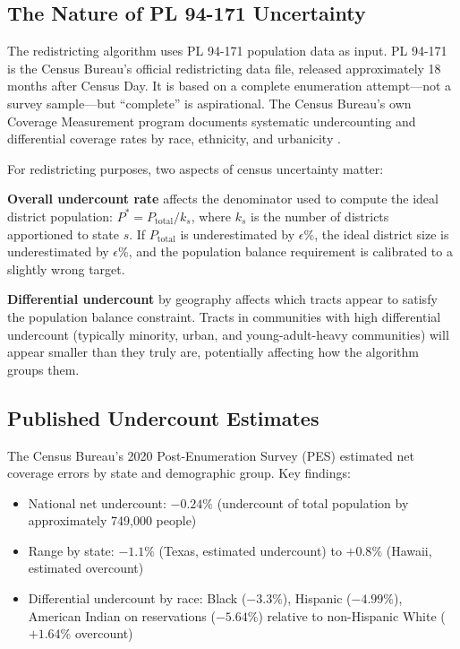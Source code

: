 
\subsection{The Nature of PL 94-171 Uncertainty}

The redistricting algorithm uses PL 94-171 population data \citep{pl94171}
as input. PL 94-171 is the Census Bureau's official redistricting data
file, released approximately 18 months after Census Day. It is based on
a complete enumeration attempt---not a survey sample---but ``complete''
is aspirational. The Census Bureau's own Coverage Measurement program
documents systematic undercounting and differential coverage rates by
race, ethnicity, and urbanicity \citep{brown2018demographic,
daponte2021census}.

For redistricting purposes, two aspects of census uncertainty matter:

\textbf{Overall undercount rate} affects the denominator used to compute
the ideal district population: $P^* = P_\text{total} / k_s$, where
$k_s$ is the number of districts apportioned to state $s$.
If $P_\text{total}$ is underestimated by $\epsilon\%$, the ideal
district size is underestimated by $\epsilon\%$, and the population
balance requirement is calibrated to a slightly wrong target.

\textbf{Differential undercount} by geography affects which tracts
appear to satisfy the population balance constraint. Tracts in
communities with high differential undercount (typically minority,
urban, and young-adult-heavy communities) will appear smaller than they
truly are, potentially affecting how the algorithm groups them.

\subsection{Published Undercount Estimates}

The Census Bureau's 2020 Post-Enumeration Survey (PES)
\citep{uscensusbureau2022net} estimated net coverage errors by state
and demographic group. Key findings:
\begin{itemize}
  \item National net undercount: $-0.24\%$ (undercount of total
    population by approximately 749,000 people)
  \item Range by state: $-1.1\%$ (Texas, estimated undercount)
    to $+0.8\%$ (Hawaii, estimated overcount)
  \item Differential undercount by race: Black ($-3.3\%$), Hispanic
    ($-4.99\%$), American Indian on reservations ($-5.64\%$) relative
    to non-Hispanic White ($+1.64\%$ overcount)
\end{itemize}

